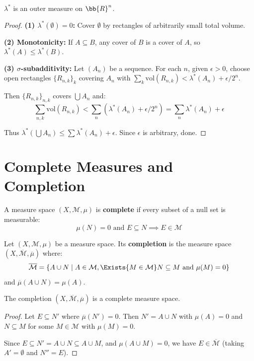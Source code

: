 \begin{proposition}
$\lambda^*$ is an outer measure on $\bb{R}^n$.
\end{proposition}

\begin{proof}
\textbf{(1) $\lambda^*(\emptyset) = 0$:} Cover $\emptyset$ by rectangles of arbitrarily small total volume.

\textbf{(2) Monotonicity:} If $A \subseteq B$, any cover of $B$ is a cover of $A$, so $\lambda^*(A) \leq \lambda^*(B)$.

\textbf{(3) $\sigma$-subadditivity:} Let $(A_n)$ be a sequence. For each $n$, given $\epsilon > 0$, choose open rectangles $\{R_{n,k}\}_k$ covering $A_n$ with $\sum_k \text{vol}(R_{n,k}) < \lambda^*(A_n) + \epsilon/2^n$.

Then $\{R_{n,k}\}_{n,k}$ covers $\bigcup A_n$ and:
\[ \sum_{n,k} \text{vol}(R_{n,k}) < \sum_n (\lambda^*(A_n) + \epsilon/2^n) = \sum_n \lambda^*(A_n) + \epsilon \]

Thus $\lambda^*(\bigcup A_n) \leq \sum \lambda^*(A_n) + \epsilon$. Since $\epsilon$ is arbitrary, done.
\end{proof}

\section{Complete Measures and Completion}

\begin{definition}
A measure space $(X, \mathcal{M}, \mu)$ is \textbf{complete} if every subset of a null set is measurable:
\[ \mu(N) = 0 \text{ and } E \subseteq N \implies E \in \mathcal{M} \]
\end{definition}

\begin{definition}
Let $(X, \mathcal{M}, \mu)$ be a measure space. Its \textbf{completion} is the measure space $(X, \overline{\mathcal{M}}, \overline{\mu})$ where:
\[ \overline{\mathcal{M}} = \{ A \cup N \mid A \in \mathcal{M}, \Exists{M \in \mathcal{M}} N \subseteq M \text{ and } \mu(M) = 0 \} \]
and $\overline{\mu}(A \cup N) = \mu(A)$.
\end{definition}

\begin{proposition}
The completion $(X, \overline{\mathcal{M}}, \overline{\mu})$ is a complete measure space.
\end{proposition}

\begin{proof}
Let $E \subseteq N'$ where $\overline{\mu}(N') = 0$. Then $N' = A \cup N$ with $\mu(A) = 0$ and $N \subseteq M$ for some $M \in \mathcal{M}$ with $\mu(M) = 0$.

Since $E \subseteq N' = A \cup N \subseteq A \cup M$, and $\mu(A \cup M) = 0$, we have $E \in \overline{\mathcal{M}}$ (taking $A' = \emptyset$ and $N'' = E$).
\end{proof}


